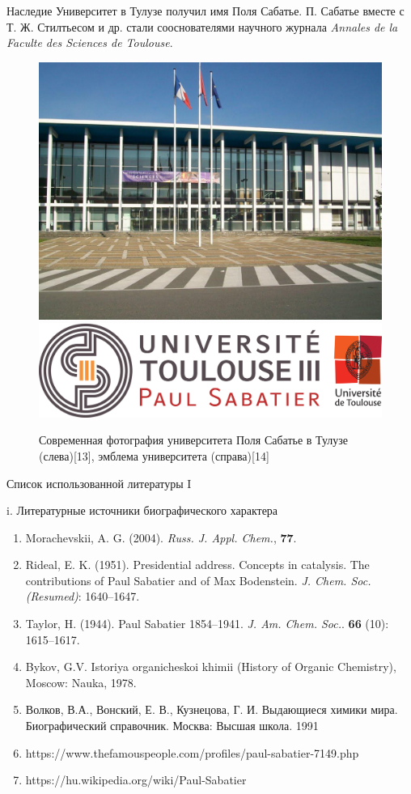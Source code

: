 \documentclass[hyperref={pdfpagelabel=false},usepdftitle=false,xcolor=dvipsnames]{beamer}
\begin{document}
\begin{frame}{Наследие}
	Университет в Тулузе получил имя Поля Сабатье. П. Сабатье вместе с Т. Ж. Стилтьесом и др. стали сооснователями научного журнала \textit{Annales de la Faculte des Sciences de Toulouse}.
	\begin{figure}
		\includegraphics[width=0.5\linewidth]{pictures/university.jpeg}
		\includegraphics[width=0.5\linewidth]{pictures/university2.jpeg}
		\caption{Современная фотография университета Поля Сабатье в Тулузе (слева)[13], эмблема университета (справа)[14]}
	\end{figure}
\end{frame}

\begin{frame}{Список использованной литературы I}
	\begin{block}{i. Литературные источники биографического характера}
	\begin{enumerate}
			\item Morachevskii, A. G. (2004). \textit{Russ. J. Appl. Chem.}, \textbf{77}.
			\item Rideal, E. K. (1951). Presidential address. Concepts in catalysis. The contributions of Paul Sabatier and of Max Bodenstein. \textit{J. Chem. Soc. (Resumed)}: 1640–1647.
			\item Taylor, H. (1944). Paul Sabatier 1854–1941. \textit{J. Am. Chem. Soc.}. \textbf{66} (10): 1615–1617.
			\item Bykov, G.V. Istoriya organicheskoi khimii (History of Organic Chemistry), Moscow: Nauka, 1978.
			\item Волков, В.А., Вонский, Е. В., Кузнецова, Г. И. Выдающиеся химики мира. Биографический справочник. Москва: Высшая школа. 1991
			\item https://www.thefamouspeople.com/profiles/paul-sabatier-7149.php
			\item https://hu.wikipedia.org/wiki/Paul-Sabatier 
	\end{enumerate}
	\end{block}
\end{frame}
\end{document}
